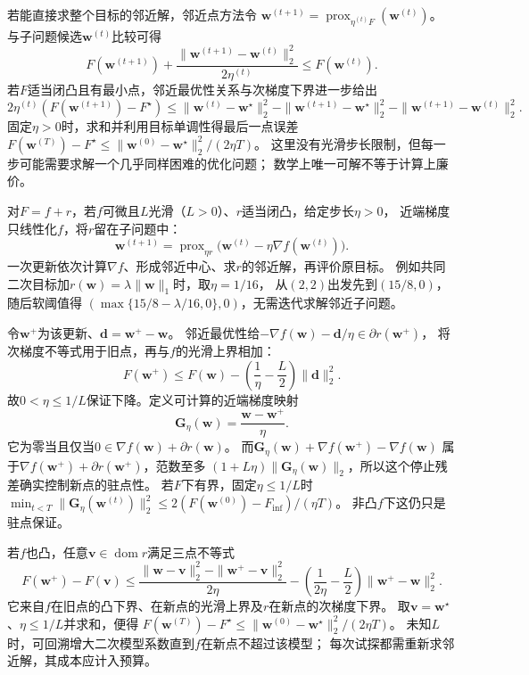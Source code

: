 若能直接求整个目标的邻近解，邻近点方法令
$\bm w^{(t+1)}=\operatorname{prox}_{\eta^{(t)} F}(\bm w^{(t)})$。
与子问题候选$\bm w^{(t)}$比较可得
\[
 F(\bm w^{(t+1)})+\frac{\|\bm w^{(t+1)}-\bm w^{(t)}\|_2^2}{2\eta^{(t)}}
 \leq F(\bm w^{(t)}).
\]
若$F$适当闭凸且有最小点，邻近最优性关系与次梯度下界进一步给出
\[
 2\eta^{(t)}(F(\bm w^{(t+1)})-F^\star)
 \leq\|\bm w^{(t)}-\bm w^\star\|_2^2
 -\|\bm w^{(t+1)}-\bm w^\star\|_2^2
 -\|\bm w^{(t+1)}-\bm w^{(t)}\|_2^2.
\]
固定$\eta>0$时，求和并利用目标单调性得最后一点误差
$F(\bm w^{(T)})-F^\star\leq\|\bm w^{(0)}-\bm w^\star\|_2^2/(2\eta T)$。
这里没有光滑步长限制，但每一步可能需要求解一个几乎同样困难的优化问题；
数学上唯一可解不等于计算上廉价。

对$F=f+r$，若$f$可微且$L$光滑（$L>0$）、$r$适当闭凸，给定步长$\eta>0$，
近端梯度只线性化$f$，将$r$留在子问题中：
\begin{equation}
 \bm w^{(t+1)}
 =\operatorname{prox}_{\eta r}
   \bigl(\bm w^{(t)}-\eta\nabla f(\bm w^{(t)})\bigr).
 \label{eq:opt-proximal-gradient-update}
\end{equation}
一次更新依次计算$\nabla f$、形成邻近中心、求$r$的邻近解，再评价原目标。
例如共同二次目标加$r(\bm w)=\lambda\|\bm w\|_1$时，取$\eta=1/16$，
从$(2,2)$出发先到$(15/8,0)$，随后软阈值得
$(\max\{15/8-\lambda/16,0\},0)$，无需迭代求解邻近子问题。

令$\bm w^+$为该更新、$\bm d=\bm w^+-\bm w$。
邻近最优性给$-\nabla f(\bm w)-\bm d/\eta\in\partial r(\bm w^+)$，
将次梯度不等式用于旧点，再与$f$的光滑上界相加：
\begin{equation}
 F(\bm w^+)\leq F(\bm w)
 -\left(\frac1\eta-\frac L2\right)\|\bm d\|_2^2.
 \label{eq:opt-proximal-gradient-descent}
\end{equation}
故$0<\eta\leq1/L$保证下降。定义可计算的近端梯度映射
\[
 \bm G_\eta(\bm w)=\frac{\bm w-\bm w^+}{\eta}.
\]
它为零当且仅当$0\in\nabla f(\bm w)+\partial r(\bm w)$。
而$\bm G_\eta(\bm w)+\nabla f(\bm w^+)-\nabla f(\bm w)$
属于$\nabla f(\bm w^+)+\partial r(\bm w^+)$，范数至多
$(1+L\eta)\|\bm G_\eta(\bm w)\|_2$，所以这个停止残差确实控制新点的驻点性。
若$F$下有界，固定$\eta\leq1/L$时
$\min_{t<T}\|\bm G_\eta(\bm w^{(t)})\|_2^2
\leq2(F(\bm w^{(0)})-F_{\inf})/(\eta T)$。
非凸$f$下这仍只是驻点保证。

若$f$也凸，任意$\bm v\in\operatorname{dom}r$满足三点不等式
\[
 F(\bm w^+)-F(\bm v)
 \leq\frac{\|\bm w-\bm v\|_2^2-\|\bm w^+-\bm v\|_2^2}{2\eta}
 -\left(\frac1{2\eta}-\frac L2\right)\|\bm w^+-\bm w\|_2^2.
\]
它来自$f$在旧点的凸下界、在新点的光滑上界及$r$在新点的次梯度下界。
取$\bm v=\bm w^\star$、$\eta\leq1/L$并求和，便得
$F(\bm w^{(T)})-F^\star\leq\|\bm w^{(0)}-\bm w^\star\|_2^2/(2\eta T)$。
未知$L$时，可回溯增大二次模型系数直到$f$在新点不超过该模型；
每次试探都需重新求邻近解，其成本应计入预算。

